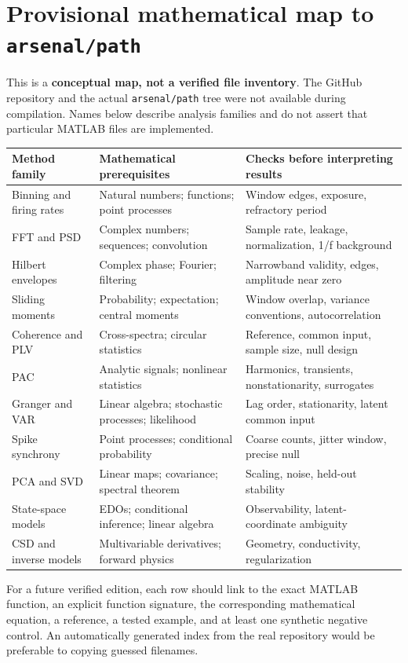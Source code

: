 \chapter{Provisional mathematical map to \texttt{arsenal/path}}\label{app:arsenal}
This is a \textbf{conceptual map, not a verified file inventory}. The GitHub repository and the actual \texttt{arsenal/path} tree were not available during compilation. Names below describe analysis families and do not assert that particular MATLAB files are implemented.
\begin{longtable}{p{}p{}p{}}\toprule
Method family & Mathematical prerequisites & Checks before interpreting results\\\midrule\endhead
Binning and firing rates & Natural numbers; functions; point processes & Window edges, exposure, refractory period\\
FFT and PSD & Complex numbers; sequences; convolution & Sample rate, leakage, normalization, 1/f background\\
Hilbert envelopes & Complex phase; Fourier; filtering & Narrowband validity, edges, amplitude near zero\\
Sliding moments & Probability; expectation; central moments & Window overlap, variance conventions, autocorrelation\\
Coherence and PLV & Cross-spectra; circular statistics & Reference, common input, sample size, null design\\
PAC & Analytic signals; nonlinear statistics & Harmonics, transients, nonstationarity, surrogates\\
Granger and VAR & Linear algebra; stochastic processes; likelihood & Lag order, stationarity, latent common input\\
Spike synchrony & Point processes; conditional probability & Coarse counts, jitter window, precise null\\
PCA and SVD & Linear maps; covariance; spectral theorem & Scaling, noise, held-out stability\\
State-space models & EDOs; conditional inference; linear algebra & Observability, latent-coordinate ambiguity\\
CSD and inverse models & Multivariable derivatives; forward physics & Geometry, conductivity, regularization\\
\bottomrule\end{longtable}
For a future verified edition, each row should link to the exact MATLAB function, an explicit function signature, the corresponding mathematical equation, a reference, a tested example, and at least one synthetic negative control. An automatically generated index from the real repository would be preferable to copying guessed filenames.